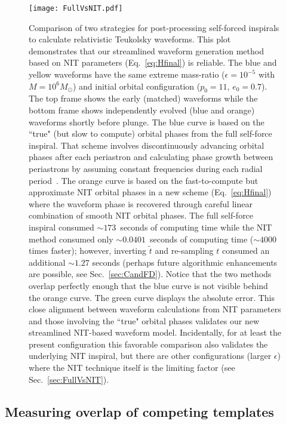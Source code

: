 \documentclass[aps,prd,twocolumn,showpacs,notitlepage,eqsecnum,
superscriptaddress,nofootinbib]{revtex4-1}
\begin{document}
\begin{figure}
\texttt{[image: FullVsNIT.pdf]}
\caption{\label{fig:FullVsNIT} Comparison of two strategies for post-processing self-forced inspirals to calculate relativistic Teukolsky waveforms. This plot demonstrates that our streamlined waveform generation method based on NIT parameters (Eq.~\eqref{eq:Hfinal}) is reliable. The blue and yellow waveforms have the same extreme mass-ratio ($\epsilon=10^{-5}$ with $M=10^6 M_\odot$) and initial orbital configuration ($p_0=11$, $e_0=0.7$). The top frame shows the early (matched) waveforms while the bottom frame shows independently evolved (blue and orange) waveforms shortly before plunge. The blue curve is based on the ``true" (but slow to compute) orbital phases from the full self-force inspiral. That scheme involves discontinuously advancing orbital phases after each periastron and calculating phase growth between periastrons by assuming constant frequencies during each radial period~\cite{WarbOsbu17}. The orange curve is based on the fast-to-compute but approximate NIT orbital phases in a new scheme (Eq.~\eqref{eq:Hfinal}) where the waveform phase is recovered through careful linear combination of smooth NIT orbital phases. The full self-force inspiral consumed $\sim 173$~seconds of computing time while the NIT method consumed only $\sim 0.0401$~seconds of computing time ($\sim 4000$ times faster); however, inverting $\tilde{t}$ and re-sampling $t$ consumed an additional $\sim 1.27$ seconds (perhaps future algorithmic enhancements are possible, see Sec.~\ref{sec:CandFD}). Notice that the two methods overlap perfectly enough that the blue curve is not visible behind the orange curve. The green curve displays the absolute error. This close alignment between waveform calculations from NIT parameters and those involving the ``true" orbital phases validates our new streamlined NIT-based waveform model. Incidentally, for at least the present configuration this favorable comparison also validates the underlying NIT inspiral, but there are other configurations (larger $\epsilon$) where the NIT technique itself is the limiting factor (see Sec.~\ref{sec:FullVsNIT}).}
\end{figure}

\subsection{Measuring overlap of competing templates}
\label{sec:overlap}
\end{document}
